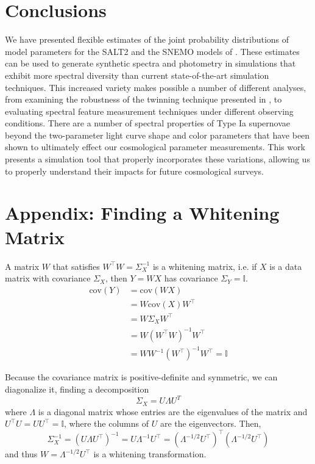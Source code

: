 \section{Conclusions}
\label{sec:conclusions}
We have presented flexible estimates of the joint probability distributions of model parameters for the SALT2 and the SNEMO models of \cite{Saunders2018}. These estimates can be used to generate synthetic spectra and photometry in simulations that exhibit more spectral diversity than current state-of-the-art simulation techniques. This increased variety makes possible a number of different analyses, from examining the robustness of the twinning technique presented in \cite{Fakhouri2015}, to evaluating spectral feature measurement techniques under different observing conditions. There are a number of spectral properties of Type Ia supernovae beyond the two-parameter light curve shape and color parameters that have been shown to ultimately effect our cosmological parameter measurements. This work presents a simulation tool that properly incorporates these variations, allowing us to properly understand their impacts for future cosmological surveys.

\section{Appendix: Finding a Whitening Matrix}
\label{app:whitening_matrix_proof}
A matrix $W$ that satisfies $W^\top W=\Sigma_X^{-1}$ is a whitening matrix, i.e. if $X$ is a data matrix with covariance $\Sigma_X$, then $Y=WX$ has covariance $\Sigma_Y=\mathbb{I}$.
\begin{align*}
    \textrm{cov}(Y) & = \textrm{cov}(WX)\\
    & = W\textrm{cov}(X)W^\top \\
    & = W\Sigma_X W^\top \\
    & = W(W^\top W)^{-1}W^\top \\
    & = WW^{-1}(W^\top)^{-1}W^\top = \mathbb{I}
\end{align*}

Because the covariance matrix is positive-definite and symmetric, we can diagonalize it, finding a decomposition
$$\Sigma_X = U\Lambda U^T$$
where $\Lambda$ is a diagonal matrix whose entries are the eigenvalues of the matrix and $U^\top U = UU^\top = \mathbb{I}$, where the columns of $U$ are the eigenvectors. Then,
$$\Sigma_X^{-1}=(U\Lambda U^\top)^{-1} = U\Lambda^{-1}U^\top = (\Lambda^{-1/2}U^\top)^\top(\Lambda^{-1/2}U^\top)$$
and thus $W = \Lambda^{-1/2}U^\top$ is a whitening transformation.
